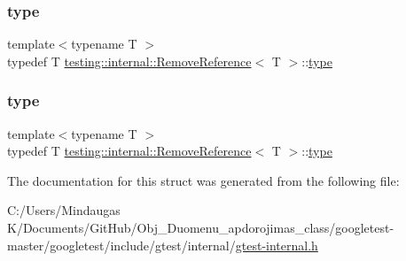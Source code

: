 \mbox{\label{structtesting_1_1internal_1_1_remove_reference_a9ca4f6499579225f7986b789ee4b2895}} 
\subsubsection{\texorpdfstring{type}{type}\hspace{0.1cm}{\footnotesize\ttfamily [2/3]}}
{\footnotesize\ttfamily template$<$typename T $>$ \\
typedef T \mbox{\hyperlink{structtesting_1_1internal_1_1_remove_reference}{testing\+::internal\+::\+Remove\+Reference}}$<$ T $>$\+::\mbox{\hyperlink{structtesting_1_1internal_1_1_remove_reference_a9ca4f6499579225f7986b789ee4b2895}{type}}}

\mbox{\label{structtesting_1_1internal_1_1_remove_reference_a9ca4f6499579225f7986b789ee4b2895}} 
\subsubsection{\texorpdfstring{type}{type}\hspace{0.1cm}{\footnotesize\ttfamily [3/3]}}
{\footnotesize\ttfamily template$<$typename T $>$ \\
typedef T \mbox{\hyperlink{structtesting_1_1internal_1_1_remove_reference}{testing\+::internal\+::\+Remove\+Reference}}$<$ T $>$\+::\mbox{\hyperlink{structtesting_1_1internal_1_1_remove_reference_a9ca4f6499579225f7986b789ee4b2895}{type}}}



The documentation for this struct was generated from the following file\+:\begin{DoxyCompactItemize}
\item 
C\+:/\+Users/\+Mindaugas K/\+Documents/\+Git\+Hub/\+Obj\+\_\+\+Duomenu\+\_\+apdorojimas\+\_\+class/googletest-\/master/googletest/include/gtest/internal/\mbox{\hyperlink{googletest-master_2googletest_2include_2gtest_2internal_2gtest-internal_8h}{gtest-\/internal.\+h}}\end{DoxyCompactItemize}
